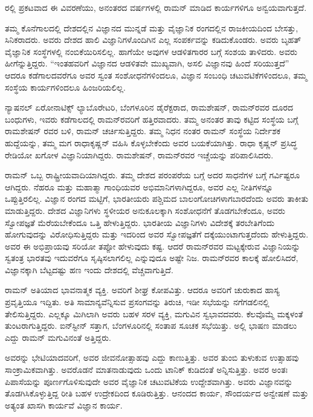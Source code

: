 \vskip 2pt

ರಲ್ಲಿ ಪ್ರಕಟವಾದ ಈ ವಿವರಣೆಯು, ಅನಂತರದ ವರ್ಷಗಳಲ್ಲಿ ರಾಮನ್ ಮಾಡಿದ ಕಾರ್ಯಗಳಿಗೂ ಅನ್ವಯವಾಗುತ್ತದೆ.

ತಮ್ಮ ಕೊನೆಗಾಲದಲ್ಲಿ ದೇಶದಲ್ಲಿನ ವಿಜ್ಞಾನದ ಮುನ್ನಡೆ ಮತ್ತು ವೈಜ್ಞಾನಿಕ ರಂಗದಲ್ಲಿನ ರಾಜಕೀಯದಿಂದ ಬೇಸತ್ತು, ಸಿನಿಕರಾದರು. ಅವರು ದೇಶದ ಹಾಲಿ ವಿಜ್ಞಾನಿಗಳೊಂದಿಗಿನ ಎಲ್ಲ ಸಂಪರ್ಕವನ್ನು ಕಡಿದುಕೊಂಡರು. ಅವರು ಬೃಹತ್ ವೈಜ್ಞಾನಿಕ ಸಂಸ್ಥೆಗಳಲ್ಲಿ ನಂಬಿಕೆಯಿರಿಸಲಿಲ್ಲ. ಹಾಗೆಯೇ ಅವುಗಳ ಆಡಳಿತಗಾರರ ಬಗ್ಗೆ ಸಂಶಯ ತಾಳಿದರು. ಅವರು ಹೀಗೆನ್ನುತ್ತಿದ್ದರು. “ಇಂತಹವರಿಗೆ ವಿಜ್ಞಾನದ ಆಡಳಿತವೇ ಮುಖ್ಯವಾಗಿ, ಅಸಲಿ ವಿಜ್ಞಾನವು ಹಿಂದೆ ಸರಿಯುತ್ತದೆ” ಆದರೂ ಕಡೆಗಾಲದವರೆಗೂ ಅವರ ಸ್ವಂತ ಸಂಶೋಧನೆಗಳಿಂದಲೂ, ವಿಜ್ಞಾನ ಸಂಬಂಧಿ ಚಟುವಟಿಕೆಗಳಿಂದಲೂ, ತಮ್ಮ ಸಂಸ್ಥೆಯ ಕಾರ್ಯಗಳಿಂದಲೂ ಹಿಂಜರಿಯಲಿಲ್ಲ.

ನ್ಯಾಷನಲ್ ಏರೋನಾಟಿಕ್ಸ್ ಲ್ಯಾಬೊರೇಟರಿ, ಬೆಂಗಳೂರಿನ ಡೈರೆಕ್ಟರಾದ, ರಾಮಶೇಷನ್, ರಾಮನ್‍ರವರ ದೂರದ ಬಂಧುಗಳು, ಇವರು ಕಡೆಗಾಲದಲ್ಲಿ ರಾಮನ್‍ರವರಿಗೆ ಹತ್ತಿರವಾದರು. ತಮ್ಮ ಅನಂತರ ತಾವು ಕಟ್ಟಿದ ಸಂಸ್ಥೆಯ ಬಗ್ಗೆ ರಾಮಶೇಷನ್ ರವರ ಬಳಿ, ರಾಮನ್ ಚರ್ಚಿಸುತ್ತಿದ್ದರು. ತಮ್ಮ ನಿಧನ ನಂತರ ರಾಮನ್ ಸಂಸ್ಥೆಯ ನಿರ್ದೇಶಕ ಹುದ್ದೆಯನ್ನು, ತಮ್ಮ ಮಗ ರಾಧಾಕೃಷ್ಣನ್ ವಹಿಸಿ ಕೊಳ್ಳಬೇಕೆಂದು ಅವರ ಬಯಕೆಯಾಗಿತ್ತು. ರಾಧಾ ಕೃಷ್ಣನ್ ಪ್ರಸಿದ್ಧ ರೇಡಿಯೋ ಖಗೋಳ ವಿಜ್ಞಾನಿಯಾಗಿದ್ದರು. ರಾಮಶೇಷನ್, ರಾಮನ್‍ರವರ ಇಚ್ಚೆಯನ್ನು ಪರಿಪಾಲಿಸಿದರು.

ರಾಮನ್ ಒಬ್ಬ ರಾಷ್ಟ್ರೀಯವಾದಿಯಾಗಿದ್ದರು. ತಮ್ಮ ದೇಶದ ಪರಂಪರೆಯ ಬಗ್ಗೆ ಅದರ ಸಾಧನೆಗಳ ಬಗ್ಗೆ ಗರ್ವಿಷ್ಟರೂ ಆಗಿದ್ದರು. ನೆಹರೂ ಮತ್ತು ಮಹಾತ್ಮಾ ಗಾಂಧಿಯವರ ಅಭಿಮಾನಿ\-ಗಳಾಗಿದ್ದರೂ, ಅವರ ಎಲ್ಲ ನೀತಿಗಳನ್ನೂ ಒಪ್ಪುತ್ತಿರಲಿಲ್ಲ. ವಿಜ್ಞಾನ ರಂಗದ ಮಟ್ಟಿಗೆ, ಭಾರತೀಯರು ಪಶ್ಚಿಮದ ಬಾಲಂಗೋಚಿಗಳಾಗಬಾರದೆಂದು ಅವರು ತಾಕೀತು ಮಾಡುತ್ತಿದ್ದರು. ದೇಶದ ವಿಜ್ಞಾನಿಗಳು ಸ್ಥಳೀಯರ ಅನುಕೂಲಕ್ಕಾಗಿ ಸಂಶೋಧನೆಗೆ ತೊಡಗಬೇಕೆಂದೂ, ಅವರು ಸ್ವೋಪಜ್ಞತೆ ಮೆರೆಯ\-ಬೇಕೆಂದೂ ಒತ್ತಿ ಹೇಳುತ್ತಿದ್ದರು. ಭಾರತೀಯ ವಿಜ್ಞಾನಿಗಳು ವಿದೇಶಕ್ಕೆ ತರಬೇತಿಗೆಂದು ಹೋಗುವುದನ್ನು ವಿರೋಧಿಸುತ್ತಿದ್ದರು ಮತ್ತು ಇದರಿಂದ ಅವರ ಸ್ವೋಪಜ್ಞತೆಗೆ ದಕ್ಕೆಯುಂಟಾಗುತ್ತದೆಂದು ಹೇಳುತ್ತಿದ್ದರು. ಅವರ ಈ ಅಭಿಪ್ರಾಯವು ಸರಿಯೋ ತಪ್ಪೋ ಹೇಳುವುದು ಕಷ್ಟ. ಆದರೆ ರಾಮನ್‍ರವರ ಮಟ್ಟಕ್ಕೇರುವ ವಿಜ್ಞಾನಿಯನ್ನು ಸ್ವತಂತ್ರ ಭಾರತವು ಇದುವರೆಗೂ ಸೃಷ್ಠಿಸಲಾಗಲಿಲ್ಲ ಎನ್ನುವುದೂ ಅಷ್ಟೇ ನಿಜ. ರಾಮನ್‍ರವರ ಕಾಲಕ್ಕೆ ಹೋಲಿಸಿದರೆ, ವಿಜ್ಞಾನಕ್ಕಾಗಿ ಬೆಟ್ಟದಷ್ಟು ಹಣ ಇಂದು ದೇಶದಲ್ಲಿ ವೆಚ್ಚವಾಗುತ್ತಿದೆ.

ರಾಮನ್ ಅತಿಯಾದ ಭಾವನಾತ್ಮಕ ವ್ಯಕ್ತಿ. ಅವರಿಗೆ ಶೀಘ್ರ ಕೋಪವಿತ್ತು. ಆದರೂ ಅವರಿಗೆ ಚುರುಕಾದ ಹಾಸ್ಯ ಪ್ರವೃತ್ತಿಯೂ ಇದ್ದಿತು. ಅತಿ ಸಾಮಾನ್ಯವೆನ್ನಿಸುವ ಪ್ರಸಂಗವನ್ನು ತಿರುಚಿ, ಇಡೀ ಸಭೆಯನ್ನು ನಗೆಗಡಲಿನಲ್ಲಿ ತೇಲಿಸುತ್ತಿದ್ದರು. ಎಲ್ಲಕ್ಕೂ ಮಿಗಿಲಾಗಿ ಅವರು ಬಹಳ ಸರಳ ವ್ಯಕ್ತಿ, ಮಗುವಿನ ಸ್ವಭಾವದವರು. ಕೆಲವೊಮ್ಮೆ ಮಕ್ಕಳಂತೆ ತುಂಟರಾಗುತ್ತಿದ್ದರು. ಐನ್‍ಸ್ಟೀನ್ ಸತ್ತಾಗ, ಬೆಂಗಳೂರಿನಲ್ಲಿ ಸಂತಾಪ ಸೂಚಕ ಸಭೆಯಿತ್ತು. ಅಲ್ಲಿ ಭಾಷಣ ಮಾಡಲು ಎದ್ದು ರಾಮನ್ ಮಗುವಿ\-ನಂತೆ ಅತ್ತಿದ್ದರು.

ಅವರನ್ನು ಭೇಟಿಯಾದವರಿಗೆ, ಅವರ ಜೀವನೋತ್ಸಾಹವು ಎದ್ದು ಕಾಣುತ್ತಿತ್ತು. ಅವರ ತುಂಬಿ ತುಳುಕುವ ಉತ್ಸಾಹವು ಸಾಂಕ್ರಾಮಿಕವಾಗಿತ್ತು. ಅವರೊಡನೆ ಮಾತನಾಡುವುದು ಒಂದು ಟಾನಿಕ್ ಕುಡಿದಂತೆ ಅನ್ನಿಸುತ್ತಿತ್ತು. ಅವರ ಅಂತಃ ಪಿಪಾಸೆಯನ್ನು ಪೂರ್ಣಗೊಳಿಸುವುದೇ ಅವರ ವೈಜ್ಞಾನಿಕ ಚಟುವಟಿಕೆಯ ಉದ್ದೇಶವಾಗಿತ್ತು. ಅವರು ವಿಜ್ಞಾನವನ್ನು ತೊಡಗಿಸಿಕೊಳ್ಳುತ್ತಿದ್ದ ರೀತಿ ಬಹಳ ಉದ್ರೇಕದಿಂದ ಕೂಡಿರುತ್ತಿತ್ತು. ಆನಂದದ ಕಾರ್ಯ, ಸೌಂದರ್ಯದ ಅನ್ವೇಷಣೆ ಮತ್ತು ಅತ್ಯಂತ ಖಾಸಗಿ ಕಾರ್ಯವೆ ವಿಜ್ಞಾನ ಕಾರ್ಯ.

